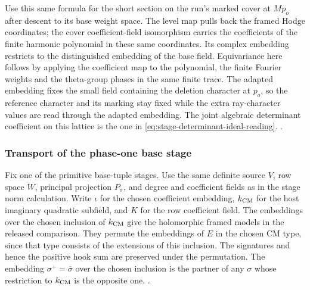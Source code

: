 Use this same formula for the short section on the run's
marked cover at \(M p_o\) after descent to its base weight
space. The level map pulls back the framed Hodge coordinates;
the cover coefficient-field isomorphism carries the
coefficients of the finite harmonic polynomial in these same
coordinates. Its complex embedding restricts to the
distinguished embedding of the base field. Equivariance here
follows by applying the coefficient map to the polynomial,
the finite Fourier weights and the theta-group phases in the
same finite trace. The adapted embedding fixes the small
field containing the deletion character at \(p_o\), so the
reference character and its marking stay fixed while the
extra ray-character values are read through the adapted
embedding. The joint algebraic determinant coefficient on
this lattice is the one in \eqref{eq:stage-determinant-ideal-reading}.
.

\subsubsection{Transport of the phase-one base stage}\label{sec:stage-conjugate-transport}
Fix one of the primitive base-tuple stages. Use the same
definite source \(V\), row space \(W\), principal
projection \(P_\sigma\), and degree and coefficient fields
as in the stage norm calculation. Write \(\iota\) for the
chosen coefficient embedding, \(k_{\rm CM}\) for the host
imaginary quadratic subfield, and \(K\) for the row
coefficient field. The embeddings over the chosen inclusion
of \(k_{\rm CM}\) give the holomorphic framed models in the
released comparison. They permute the embeddings of \(E\)
in the chosen CM type, since that type consists of the
extensions of this inclusion. The signatures and hence
the positive hook sum are preserved under the permutation.
The embedding \(\sigma^+=\overline{\sigma}\) over the
chosen inclusion is the partner of any \(\sigma\) whose
restriction to \(k_{\rm CM}\) is the opposite one.
.

